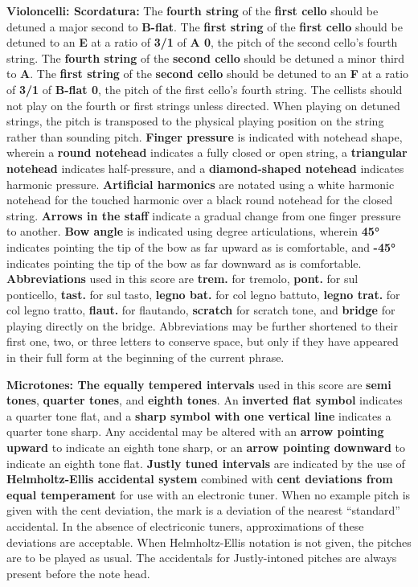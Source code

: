 \documentclass[12pt]{article}
\newcommand*\circled[1]{\tikz[baseline=(char.base)]{
            \node[shape=circle,draw,inner sep=1pt] (char) {#1};}}
\begin{document}
\begingroup
\textbf{Violoncelli: \circled{1} Scordatura:} The \textbf{fourth string} of the \textbf{first cello} should be detuned a major second to \textbf{B-flat}. The \textbf{first string} of the \textbf{first cello} should be detuned to an \textbf{E} at a ratio of \textbf{3/1} of \textbf{A 0}, the pitch of the second cello's fourth string. The \textbf{fourth string} of the \textbf{second cello} should be detuned a minor third to \textbf{A}. The \textbf{first string} of the \textbf{second cello} should be detuned to an \textbf{F} at a ratio of \textbf{3/1} of \textbf{B-flat 0}, the pitch of the first cello's fourth string. The cellists should not play on the fourth or first strings unless directed. When playing on detuned strings, the pitch is transposed to the physical playing position on the string rather than sounding pitch. \textbf{\circled{2} Finger pressure} is indicated with notehead shape, wherein a \textbf{round notehead} indicates a fully closed or open string, a \textbf{triangular notehead} indicates half-pressure, and a \textbf{diamond-shaped notehead} indicates harmonic pressure. \textbf{\circled{3} Artificial harmonics} are notated using a white harmonic notehead for the touched harmonic over a black round notehead for the closed string. \textbf{\circled{4} Arrows in the staff} indicate a gradual change from one finger pressure to another. \textbf{\circled{5} Bow angle} is indicated using degree articulations, wherein \textbf{45°} indicates pointing the tip of the bow as far upward as is comfortable, and \textbf{-45°} indicates pointing the tip of the bow as far downward as is comfortable. \textbf{\circled{6} Abbreviations} used in this score are \textbf{trem.} for tremolo, \textbf{pont.} for sul ponticello, \textbf{tast.} for sul tasto,  \textbf{legno bat.} for col legno battuto, \textbf{legno trat.} for col legno tratto, \textbf{flaut.} for flautando, \textbf{scratch} for scratch tone, and \textbf{bridge} for playing directly on the bridge. Abbreviations may be further shortened to their first one, two, or three letters to conserve space, but only if they have appeared in their full form at the beginning of the current phrase. 
\endgroup

\begingroup
\textbf{Microtones: \circled{1} The equally tempered intervals} used in this score are \textbf{semi tones}, \textbf{quarter tones}, and \textbf{eighth tones}. An \textbf{inverted flat symbol} indicates a quarter tone flat, and a \textbf{sharp symbol with one vertical line} indicates a quarter tone sharp. Any accidental may be altered with an \textbf{arrow pointing upward} to indicate an eighth tone sharp, or an \textbf{arrow pointing downward} to indicate an eighth tone flat. \textbf{\circled{2} Justly tuned intervals} are indicated by the use of \textbf{Helmholtz-Ellis accidental system} combined with \textbf{cent deviations from equal temperament} for use with an electronic tuner. When no example pitch is given with the cent deviation, the mark is a deviation of the nearest “standard” accidental. In the absence of electriconic tuners, approximations of these deviations are acceptable. When Helmholtz-Ellis notation is not given, the pitches are to be played as usual. The accidentals for Justly-intoned pitches are always present before the note head.
\endgroup
\end{document}
